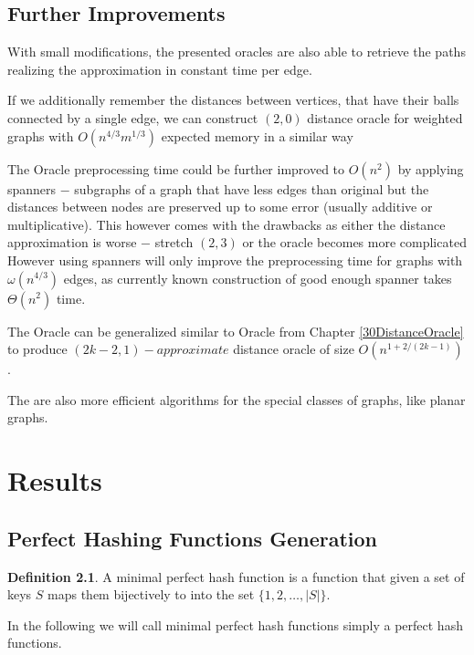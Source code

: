 \documentclass[shortabstract, lic, english]{iithesis}
\theoremstyle{definition} \newtheorem{definition}{Definition}[chapter]
\theoremstyle{plain} \newtheorem{remark}[definition]{Observation}
\theoremstyle{plain} \newtheorem{theorem}[definition]{Theorem}
\theoremstyle{plain} \newtheorem{lemma}[definition]{Lemma}
\theoremstyle{plain} \newtheorem{conjecture}[definition]{Conjecture}
\begin{document}
\section{Further Improvements}

With small modifications, the presented oracles are also able to retrieve the paths realizing the approximation in constant time per edge.

If we additionally remember the distances between vertices, that have their balls connected by a single edge, we can construct $(2,0)$ distance oracle for weighted graphs with $O(n^{4/3}m^{1/3})$ expected memory in a similar way \cite{21OracleLessMemory}

The Oracle preprocessing time could be further improved to $O(n^2)$ by applying spanners $-$ subgraphs of a graph that have less edges than original
but the distances between nodes are preserved up to some error (usually additive or multiplicative).
This however comes with the drawbacks as either the distance approximation is worse $-$ stretch $(2,3)$ \cite{21OracleBasic} or the oracle becomes more complicated \cite{21OracleSpannerNoPenalty, 21OracleSpannerNoPenaltyNoLog}
However using spanners will only improve the preprocessing time for graphs with $\omega(n^{4/3})$ edges, as currently known construction of good enough spanner takes $\Theta(n^2)$ time.

The Oracle can be generalized similar to Oracle from Chapter \ref{30DistanceOracle} to produce $(2k - 2, 1)-approximate$ distance oracle of size $O(n^{1 + 2/(2k-1)})$ \cite{a1Oracle}.

The are also more efficient algorithms for the special classes of graphs, like planar graphs.


\chapter{Results} \label{21PracticalComparison}

\section{Perfect Hashing Functions Generation}

\begin{definition}
    A minimal perfect hash function is a function that given a set of keys $S$ maps them bijectively to into the set $\{1,2,\ldots,|S|\}$.
\end{definition}

In the following we will call minimal perfect hash functions simply a perfect hash functions.
\end{document}

